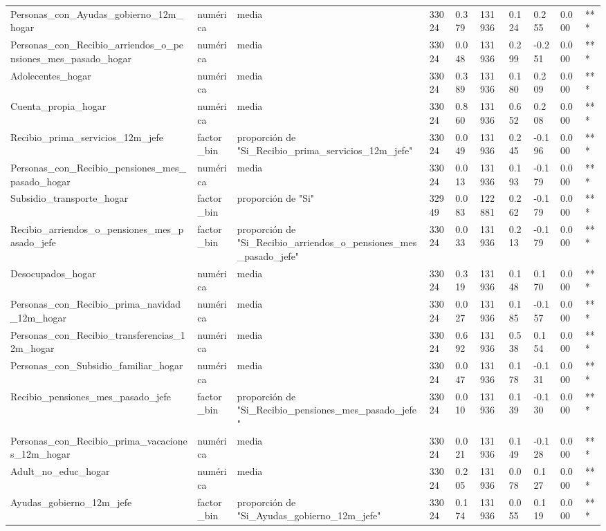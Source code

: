 \begin{longtable}[t]{llllllllll}
Personas\_con\_Ayudas\_gobierno\_12m\_hogar & numérica & media & 33024 & 0.379 & 131936 & 0.124 & 0.255 & 0.000 & ***\\
Personas\_con\_Recibio\_arriendos\_o\_pensiones\_mes\_pasado\_hogar & numérica & media & 33024 & 0.048 & 131936 & 0.299 & -0.251 & 0.000 & ***\\
Adolecentes\_hogar & numérica & media & 33024 & 0.389 & 131936 & 0.180 & 0.209 & 0.000 & ***\\
Cuenta\_propia\_hogar & numérica & media & 33024 & 0.860 & 131936 & 0.652 & 0.208 & 0.000 & ***\\
Recibio\_prima\_servicios\_12m\_jefe & factor\_bin & proporción de "Si\_Recibio\_prima\_servicios\_12m\_jefe" & 33024 & 0.049 & 131936 & 0.245 & -0.196 & 0.000 & ***\\
Personas\_con\_Recibio\_pensiones\_mes\_pasado\_hogar & numérica & media & 33024 & 0.013 & 131936 & 0.193 & -0.179 & 0.000 & ***\\
Subsidio\_transporte\_hogar & factor\_bin & proporción de "Si" & 32949 & 0.083 & 122881 & 0.262 & -0.179 & 0.000 & ***\\
Recibio\_arriendos\_o\_pensiones\_mes\_pasado\_jefe & factor\_bin & proporción de "Si\_Recibio\_arriendos\_o\_pensiones\_mes\_pasado\_jefe" & 33024 & 0.033 & 131936 & 0.213 & -0.179 & 0.000 & ***\\
Desocupados\_hogar & numérica & media & 33024 & 0.319 & 131936 & 0.148 & 0.170 & 0.000 & ***\\
Personas\_con\_Recibio\_prima\_navidad\_12m\_hogar & numérica & media & 33024 & 0.027 & 131936 & 0.185 & -0.157 & 0.000 & ***\\
Personas\_con\_Recibio\_transferencias\_12m\_hogar & numérica & media & 33024 & 0.692 & 131936 & 0.538 & 0.154 & 0.000 & ***\\
Personas\_con\_Subsidio\_familiar\_hogar & numérica & media & 33024 & 0.047 & 131936 & 0.178 & -0.131 & 0.000 & ***\\
Recibio\_pensiones\_mes\_pasado\_jefe & factor\_bin & proporción de "Si\_Recibio\_pensiones\_mes\_pasado\_jefe" & 33024 & 0.010 & 131936 & 0.139 & -0.130 & 0.000 & ***\\
Personas\_con\_Recibio\_prima\_vacaciones\_12m\_hogar & numérica & media & 33024 & 0.021 & 131936 & 0.149 & -0.128 & 0.000 & ***\\
Adult\_no\_educ\_hogar & numérica & media & 33024 & 0.205 & 131936 & 0.078 & 0.127 & 0.000 & ***\\
Ayudas\_gobierno\_12m\_jefe & factor\_bin & proporción de "Si\_Ayudas\_gobierno\_12m\_jefe" & 33024 & 0.174 & 131936 & 0.055 & 0.119 & 0.000 & ***\\

\end{longtable}
